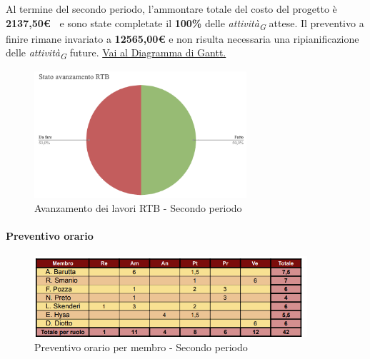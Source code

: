 \vspace{1cm}

Al termine del secondo periodo, l'ammontare totale del costo del progetto è \textbf{2137,50\euro\ } e sono state completate il \textbf{100\%} delle \textit{attività}\textsubscript{\textit{G}} attese.
Il preventivo a finire rimane invariato a \textbf{12565,00€} e non risulta necessaria una ripianificazione delle \textit{attività}\textsubscript{\textit{G}} future.
\href{https://github.com/orgs/ByteOps-swe/projects/3/views/1?sortedBy%5Bdirection%5D=asc&sortedBy%5BcolumnId%5D=64182560}{Vai al Diagramma di Gantt.}


\begin{figure}[H]
    \centering
    \begin{minipage}[b]{0.70\textwidth}
        \centering
        \includegraphics[width=0.7\textwidth]{../Images/torta2.png}
        \caption{Avanzamento dei lavori RTB - Secondo periodo}
        \label{fig:Avanzamento_RTB_2}
    \end{minipage}
\end{figure}



\paragraph{Preventivo orario}

\begin{figure}[H]
    \centering
    \includegraphics[width=0.9\textwidth]{../Images/tabPrev2.png}
    \caption{Preventivo orario per membro - Secondo periodo}
    \label{fig:Preventivo_orario_2}
\end{figure}

